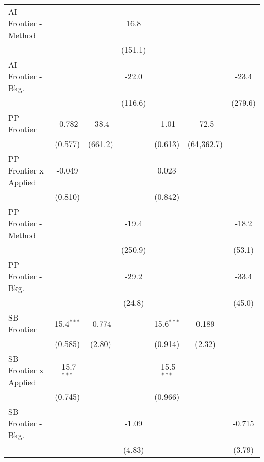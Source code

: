 \begin{tabular}{lcccccc}
   AI Frontier - Method         &               &         & 16.8    &               &            &   \\   
                                &               &         & (151.1) &               &            &   \\   
   AI Frontier - Bkg.           &               &         & -22.0   &               &            & -23.4\\   
                                &               &         & (116.6) &               &            & (279.6)\\   
   PP Frontier                  & -0.782        & -38.4   &         & -1.01         & -72.5      &   \\   
                                & (0.577)       & (661.2) &         & (0.613)       & (64,362.7) &   \\   
   PP Frontier x Applied        & -0.049        &         &         & 0.023         &            &   \\   
                                & (0.810)       &         &         & (0.842)       &            &   \\   
   PP Frontier - Method         &               &         & -19.4   &               &            & -18.2\\   
                                &               &         & (250.9) &               &            & (53.1)\\   
   PP Frontier - Bkg.           &               &         & -29.2   &               &            & -33.4\\   
                                &               &         & (24.8)  &               &            & (45.0)\\   
   SB Frontier                  & 15.4$^{***}$  & -0.774  &         & 15.6$^{***}$  & 0.189      &   \\   
                                & (0.585)       & (2.80)  &         & (0.914)       & (2.32)     &   \\   
   SB Frontier x Applied        & -15.7$^{***}$ &         &         & -15.5$^{***}$ &            &   \\   
                                & (0.745)       &         &         & (0.966)       &            &   \\   
   SB Frontier - Bkg.           &               &         & -1.09   &               &            & -0.715\\   
                                &               &         & (4.83)  &               &            & (3.79)\\   

\end{tabular}

